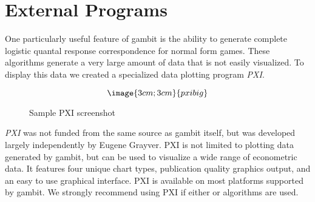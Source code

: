 \chapter{External Programs}
One particularly useful feature of gambit is the ability to generate complete 
logistic quantal response correspondence for normal form games.  These
algorithms generate a very large amount of data that is not easily visualized.
To display this data we created a specialized data plotting program {\em PXI}.


\begin{figure}
$$\image{3cm;3cm}{pxibig}$$
\caption{Sample PXI screenshot}\label{fig_pxibig}
\end{figure}

{\em PXI} was not funded from the same source as gambit itself, but was 
developed largely independently by Eugene Grayver.  PXI is not limited to
plotting data generated by gambit, but can be used to visualize a wide range
of econometric data.  It features four unique chart types, publication quality
graphics output, and an easy to use graphical interface.  PXI is available on
most platforms supported by gambit.  We strongly recommend using PXI if
either  or  algorithms are used.





%
\setfooter{\thepage}{}{}{}{}{\thepage}%

